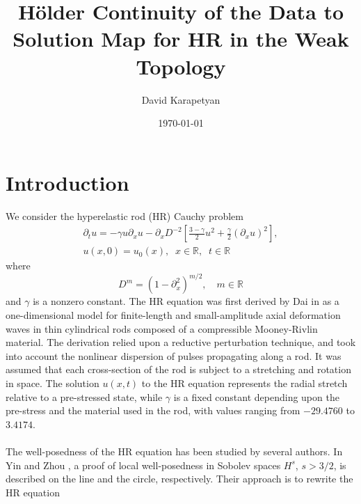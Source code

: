 \documentclass[12pt,reqno]{amsart}
\numberwithin{equation}{section}  %
\numberwithin{figure}{section}
\newcommand{\rr}{\mathbb{R}}
\newcommand{\p}{\partial}
\begin{document}
\title[H\"older Continuity of the Data to Solution Map for HR]{H\"older Continuity of the Data to Solution Map for HR in the
Weak Topology}
\author{David Karapetyan}
\address{Department of Mathematics  \\
    University  of Notre Dame\\
        Notre Dame, IN 46556 }
        \date{\today}
        \maketitle
        \section{Introduction}
%
%
%
We consider the hyperelastic rod (HR) Cauchy problem
\begin{gather}
 \p_t u =  -\gamma u \p_x u -
 \p_{x} D^{-2} \left[ \frac{3-\gamma}{2}u^2 +
\frac{\gamma}{2} \left( \p_x u \right)^2
\right],
\label{hyperelastic-rod-equation}
\\
 u(x,0) = u_0(x), \; \; x \in \rr, \; \; t \in \rr
\label{init-cond}
\end{gather}
%
%
where 
\begin{equation*}
	D^{m} = (1 - \p_x^2)^{m/2}, \quad m \in \rr
\end{equation*}
and  $\gamma$  is a  nonzero constant. The HR equation was first
derived by Dai in \cite{Dai_1998_Model-equations} as a one-dimensional 
model for finite-length and
small-amplitude axial deformation waves in thin cylindrical
rods composed of a compressible Mooney-Rivlin
material. The derivation relied upon a reductive perturbation technique, 
and took into account the nonlinear dispersion of pulses propagating 
along a rod. It was assumed that each cross-section of the rod is 
subject to a stretching and rotation in space. The solution $u(x,t)$ to the 
HR equation represents the radial stretch relative
to a pre-stressed state, while $\gamma$ is a fixed constant depending upon 
the pre-stress and the material used in
the rod, with values ranging from $- 29.4760$ to $3.4174$.
%
\\
\\
The well-posedness of the HR equation has been studied by several authors. 
In Yin \cite{Yin_2003_On-the-Cauchy-p} and Zhou 
\cite{Zhou_2005_Local-well-pose}, a proof of local well-posedness in Sobolev 
spaces $H^s$,  $s > 3/2$, is described  on the line and the circle, respectively. 
Their approach is to rewrite the HR equation   
\end{document}
